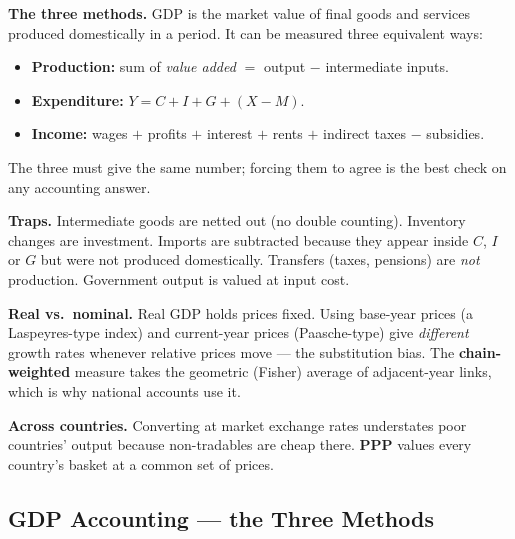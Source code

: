 \documentclass[12pt, letterpaper]{article}
\begin{document}
\begin{tcolorbox}[theorybox,title={Chapter 1 Overview}]
\textbf{The three methods.} GDP is the market value of final goods and services produced
domestically in a period. It can be measured three equivalent ways:
\begin{itemize}[leftmargin=1.3em,itemsep=2pt,topsep=2pt]
\item \textbf{Production:} sum of \emph{value added} $=$ output $-$ intermediate inputs.
\item \textbf{Expenditure:} $Y = C + I + G + (X - M)$.
\item \textbf{Income:} wages $+$ profits $+$ interest $+$ rents $+$ indirect taxes $-$ subsidies.
\end{itemize}
The three must give the same number; forcing them to agree is the best check on any
accounting answer.

\medskip
\textbf{Traps.} Intermediate goods are netted out (no double counting). Inventory changes
are investment. Imports are subtracted because they appear inside $C$, $I$ or $G$ but were
not produced domestically. Transfers (taxes, pensions) are \emph{not} production. Government
output is valued at input cost.

\medskip
\textbf{Real vs.\ nominal.} Real GDP holds prices fixed. Using base-year prices
(a Laspeyres-type index) and current-year prices (Paasche-type) give \emph{different}
growth rates whenever relative prices move --- the substitution bias. The
\textbf{chain-weighted} measure takes the geometric (Fisher) average of adjacent-year
links, which is why national accounts use it.

\medskip
\textbf{Across countries.} Converting at market exchange rates understates poor countries'
output because non-tradables are cheap there. \textbf{PPP} values every country's basket at
a common set of prices.
\end{tcolorbox}

\subsection{GDP Accounting --- the Three Methods}
\end{document}
